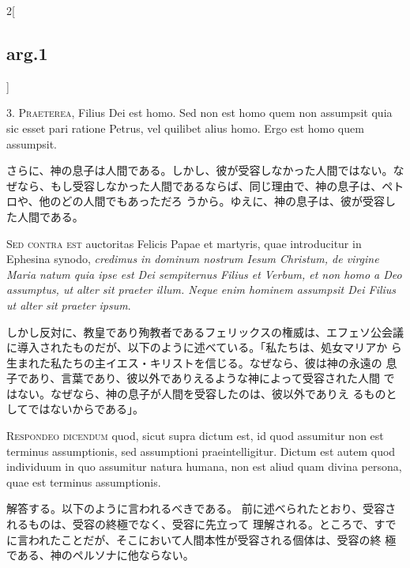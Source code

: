 \documentclass[paper=a4paper,fontsize=10pt,jafontsize=9pt,titlepage]{jlreq}
\begin{document}
\begin{paracol}{2}[\subsection{arg.1}]

3. {\scshape Praeterea}, Filius Dei est homo. Sed non est homo quem non assumpsit quia
sic esset pari ratione Petrus, vel quilibet alius homo. Ergo est homo
quem assumpsit.

\switchcolumn

さらに、神の息子は人間である。しかし、彼が受容しなかった人間ではない。な
 ぜなら、もし受容しなかった人間であるならば、同じ理由で、神の息子は、ペトロや、他のどの人間でもあっただろ
 うから。ゆえに、神の息子は、彼が受容した人間である。

\switchcolumn*[\subsection{s.c.}]

{\scshape Sed contra est} auctoritas Felicis Papae et martyris, quae introducitur
in Ephesina synodo, {\itshape credimus in dominum nostrum Iesum Christum, de
virgine Maria natum quia ipse est Dei sempiternus Filius et Verbum, et
non homo a Deo assumptus, ut alter sit praeter illum. Neque enim hominem
assumpsit Dei Filius ut alter sit praeter ipsum}.

\switchcolumn

しかし反対に、教皇であり殉教者であるフェリックスの権威は、エフェソ公会議
 に導入されたものだが、以下のように述べている。「私たちは、処女マリアか
 ら生まれた私たちの主イエス・キリストを信じる。なぜなら、彼は神の永遠の
 息子であり、言葉であり、彼以外でありえるような神によって受容された人間
 ではない。なぜなら、神の息子が人間を受容したのは、彼以外でありえ
 るものとしてではないからである」。


{\scshape Respondeo dicendum} quod, sicut supra dictum est, id quod assumitur non
est terminus assumptionis, sed assumptioni praeintelligitur. Dictum est
autem quod individuum in quo assumitur natura humana, non est aliud quam
divina persona, quae est terminus assumptionis.

\switchcolumn

解答する。以下のように言われるべきである。
前に述べられたとおり、受容されるものは、受容の終極でなく、受容に先立って
 理解される。ところで、すでに言われたことだが、そこにおいて人間本性が受容される個体は、受容の終
 極である、神のペルソナに他ならない。


\end{paracol}
\end{document}
